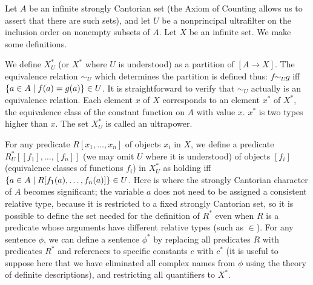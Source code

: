 Let $A$ be an infinite strongly Cantorian set
(the Axiom of Counting 
allows us to assert that there are such sets), and let $U$ be a
nonprincipal ultrafilter on the inclusion order on nonempty subsets of
$A$.  Let $X$ be an infinite set.  We make some definitions.

\begin{definition}
 We define $X^*_U$ (or $X^*$ where $U$ is
 understood) as a partition of $[A \rightarrow X]$.  The
 equivalence relation
 $\sim_U$ which determines the partition is defined thus: $f \sim_U g$ iff $\{a
 \in A \mid f(a)=g(a)\} \in U$.  It is straightforward to verify that $\sim_U$
 actually is an equivalence relation.  Each element $x$ of $X$ corresponds to
 an element $x^*$ of $X^*$, the equivalence class of the constant function on $A$ with 
 value $x$.  $x^*$ is two types higher than $x$.  The
 set $X^*_U$ is called an {\upshape ultrapower}.
\end{definition}

\begin{definition}
 For any predicate $R[x_1,\ldots,x_n]$ of objects
 $x_i$ in $X$, we define a predicate $R^*_U[[f_1],\ldots,[f_n]]$ (we
 may omit $U$ where it is understood) of objects $[f_i]$ (equivalence
 classes of functions $f_i$)
 in $X^*_U$ as holding iff $\{a \in A \mid R[f_1(a),\ldots,f_n(a)]\}\in U$.
 Here is where the strongly Cantorian 
 character of $A$ becomes significant; the variable $a$ does not need
 to be assigned a consistent relative type, because it
 is restricted to a fixed strongly Cantorian set, so it is possible to define
 the set needed for the definition of $R^*$ even when $R$ is a predicate whose
 arguments have different relative types (such as $\in$).  For any
 sentence $\phi$, we can define a sentence $\phi^*$ by replacing all
 predicates $R$ with predicates $R^*$ and references to specific
 constants $c$ with $c^*$ (it is useful to suppose here that we have
 eliminated all complex names from $\phi$ using the theory of definite
 descriptions), and restricting all quantifiers to $X^*$.
\end{definition}

